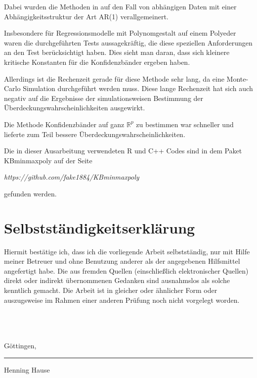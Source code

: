 \documentclass[12pt,a4paper]{article}
\theoremstyle{definition}
\theoremstyle{definition}
\theoremstyle{definition}
\theoremstyle{definition}
\begin{document}
Dabei wurden die Methoden in \cite{Liu64} auf den Fall von abhängigen Daten mit einer Abhängigkeitsstruktur der Art AR(1) verallgemeinert.

Insbesondere für Regressionsmodelle mit Polynomgestalt auf einem Polyeder waren die durchgeführten Tests aussagekräftig, die diese speziellen Anforderungen an den Test berücksichtigt haben. Dies sieht man daran, dass sich kleinere kritische Konstanten für die Konfidenzbänder ergeben haben. 

Allerdings ist die Rechenzeit gerade für diese Methode sehr lang, da eine Monte-Carlo Simulation durchgeführt werden muss. Diese lange Rechenzeit hat sich auch negativ auf die Ergebnisse der simulationsweisen Bestimmung der Überdeckungswahrscheinlichkeiten ausgewirkt.

Die Methode Konfidenzbänder auf ganz $\mathbb{R}^p$ zu bestimmen war schneller und lieferte zum Teil bessere Überdeckungswahrscheinlichkeiten.

Die in dieser Ausarbeitung verwendeten R und C++ Codes sind in dem Paket KBminmaxpoly auf der Seite 

\begin{center}
\textit{https://github.com/fake1884/KBminmaxpoly} 
\end{center}

gefunden werden.





\nocite{Hsu41}

\newpage
\printbibliography


\newpage
\section*{Selbstständigkeitserklärung}
Hiermit bestätige ich, dass ich die vorliegende Arbeit selbstständig, nur mit Hilfe meiner Betreuer und ohne Benutzung anderer als der angegebenen Hilfsmittel angefertigt habe. Die aus fremden Quellen (einschließlich elektronischer Quellen) direkt oder indirekt übernommenen Gedanken sind ausnahmslos als solche kenntlich gemacht. Die Arbeit ist in gleicher oder ähnlicher Form oder auszugsweise im Rahmen einer anderen Prüfung noch nicht vorgelegt worden.
\\ \\ \\ \\
\parbox{5cm}{\centering Göttingen, }
\hfill\parbox{4cm}{\hrule \strut \centering  \footnotesize Henning Hause}
\end{document}
